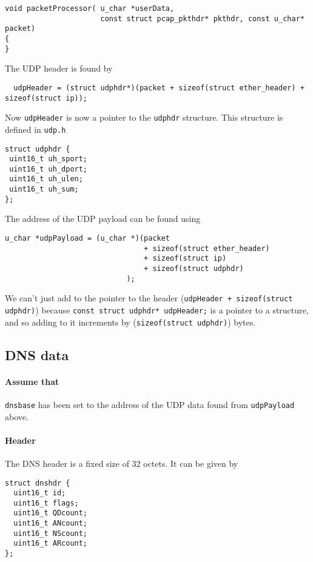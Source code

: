 \documentclass{article}
\begin{document}
\begin{verbatim}
void packetProcessor( u_char *userData, 
                      const struct pcap_pkthdr* pkthdr, const u_char* packet)
{
}
\end{verbatim}

The UDP header is found by 
\begin{verbatim}
  udpHeader = (struct udphdr*)(packet + sizeof(struct ether_header) + sizeof(struct ip));
\end{verbatim}
Now \texttt{udpHeader} is now a pointer to the \texttt{udphdr}
structure.  This structure is defined in \texttt{udp.h}  
\begin{verbatim}
struct udphdr {
 uint16_t uh_sport;
 uint16_t uh_dport;
 uint16_t uh_ulen;
 uint16_t uh_sum;
};
\end{verbatim}

The address of the UDP payload can be found using
\begin{verbatim}
u_char *udpPayload = (u_char *)(packet
                                + sizeof(struct ether_header)
                                + sizeof(struct ip)
                                + sizeof(struct udphdr)
                            );
\end{verbatim}
We can't just add to the pointer to the header 
(\texttt{udpHeader + sizeof(struct udphdr)}) 
because \texttt{const struct udphdr* udpHeader;} is a pointer to a
structure, and so adding to it increments by (\texttt{sizeof(struct
udphdr)}) bytes.

\subsection{DNS data}
\paragraph{Assume that} \texttt{dnsbase} has been set to the address of
the UDP data found from \texttt{udpPayload} above.

\paragraph{Header} The DNS header is a fixed size of 32 octets.
It can be given by
\begin{verbatim}
struct dnshdr {
  uint16_t id;
  uint16_t flags;
  uint16_t QDcount;
  uint16_t ANcount;
  uint16_t NScount;
  uint16_t ARcount;
};
\end{verbatim}
\end{document}
